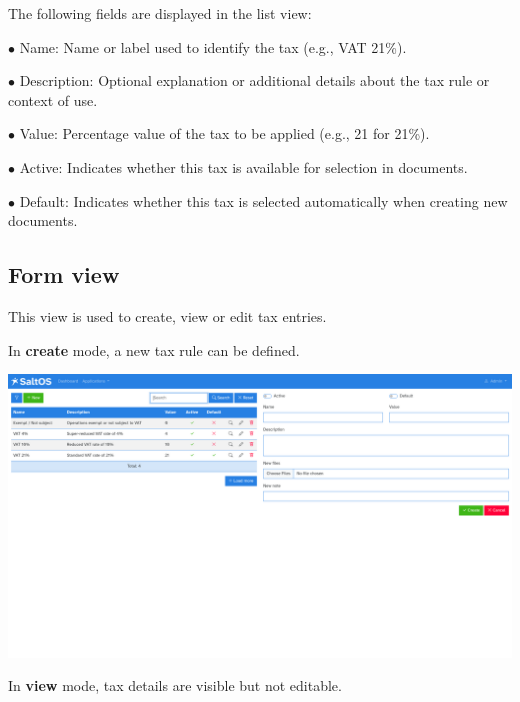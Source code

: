 \documentclass[a4paper]{article}
\begin{document}
The following fields are displayed in the list view:

\begin{compactitem}
\item[\color{myblue}$\bullet$] Name: Name or label used to identify the tax (e.g., VAT 21\%).
\item[\color{myblue}$\bullet$] Description: Optional explanation or additional details about the tax rule or context of use.
\item[\color{myblue}$\bullet$] Value: Percentage value of the tax to be applied (e.g., 21 for 21\%).
\item[\color{myblue}$\bullet$] Active: Indicates whether this tax is available for selection in documents.
\item[\color{myblue}$\bullet$] Default: Indicates whether this tax is selected automatically when creating new documents.
\end{compactitem}

\hypertarget{toc169}{}
\subsection{Form view}

This view is used to create, view or edit tax entries.

In \textbf{create} mode, a new tax rule can be defined.

\begin{center}\includegraphics[width=1\textwidth]{../ujest/snaps/test-screenshots-js-screenshots-sales-taxes-create-en-us-1-snap.png}\end{center}

In \textbf{view} mode, tax details are visible but not editable.
\end{document}
